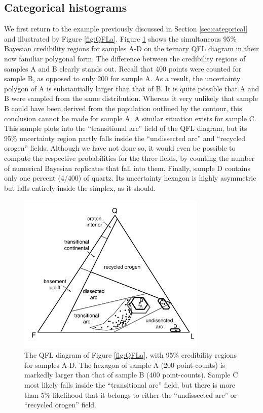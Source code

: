 \documentclass{article}
\begin{document}
\subsection{Categorical histograms} \label{sec:categoricalRevisited}

We  first  return  to  the  example previously  discussed  in  Section
\ref{sec:categorical} and illustrated by Figure \ref{fig:QFLa}. Figure
\ref{fig:QFLb}  shows  the   simultaneous  95\%  Bayesian  credibility
regions  for samples  A-D  on the  ternary  QFL diagram  in their  now
familiar  polygonal  form.   The  difference between  the  credibility
regions of samples A and B  clearly stands out. Recall that 400 points
were counted for sample  B, as opposed to only 200 for  sample A. As a
result, the uncertainty polygon of A is substantially larger than that
of B.  It  is quite possible that  A and B were sampled  from the same
distribution. Whereas it  very unlikely that sample B  could have been
derived from  the population outlined by the  contour, this conclusion
cannot be made for sample A.  A similar situation exists for sample C.
This  sample plots  into the  ``transitional  arc'' field  of the  QFL
diagram,  but its  95\%  uncertainty region  partly  falls inside  the
``undissected arc'' and ``recycled  orogen'' fields.  Although we have
not  done so,  it would  even be  possible to  compute  the respective
probabilities  for  the  three  fields,  by  counting  the  number  of
numerical Bayesian replicates that  fall into them.  Finally, sample D
contains only one percent  (4/400) of quartz.  Its uncertainty hexagon
is  highly asymmetric  but falls  entirely inside  the simplex,  as it
should.\\

\begin{figure}[h]
  \centering
  \includegraphics[width=9cm]{QFLb.pdf}
  \caption{The QFL diagram of Figure \ref{fig:QFLa}, with
95\% credibility  regions for  samples A-D.  The  hexagon of  sample A
(200  point-counts) is  markedly larger  than  that of  sample B  (400
point-counts). Sample  C most  likely falls inside  the ``transitional
arc'' field, but there is more  than 5\% likelihood that it belongs to
either the ``undissected arc'' or ``recycled orogen'' field.}
  \label{fig:QFLb}
\end{figure}
\end{document}
